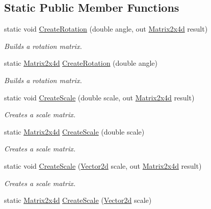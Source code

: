 \subsection*{Static Public Member Functions}
\begin{DoxyCompactItemize}
\item 
static void \hyperlink{struct_open_t_k_1_1_matrix2x4d_a724e6cc45d62b5e4b8ff8196c5c0fbd4}{Create\-Rotation} (double angle, out \hyperlink{struct_open_t_k_1_1_matrix2x4d}{Matrix2x4d} result)
\begin{DoxyCompactList}\small\item\em Builds a rotation matrix. \end{DoxyCompactList}\item 
static \hyperlink{struct_open_t_k_1_1_matrix2x4d}{Matrix2x4d} \hyperlink{struct_open_t_k_1_1_matrix2x4d_a0d8078a77dfa3958df90d6cb361e028e}{Create\-Rotation} (double angle)
\begin{DoxyCompactList}\small\item\em Builds a rotation matrix. \end{DoxyCompactList}\item 
static void \hyperlink{struct_open_t_k_1_1_matrix2x4d_adeb22dc472bba94329ecae2b73cc6a22}{Create\-Scale} (double scale, out \hyperlink{struct_open_t_k_1_1_matrix2x4d}{Matrix2x4d} result)
\begin{DoxyCompactList}\small\item\em Creates a scale matrix. \end{DoxyCompactList}\item 
static \hyperlink{struct_open_t_k_1_1_matrix2x4d}{Matrix2x4d} \hyperlink{struct_open_t_k_1_1_matrix2x4d_a24786a70e0a557087c805c5639fd072b}{Create\-Scale} (double scale)
\begin{DoxyCompactList}\small\item\em Creates a scale matrix. \end{DoxyCompactList}\item 
static void \hyperlink{struct_open_t_k_1_1_matrix2x4d_a06f7f896f263d1e538bd91985b4465a5}{Create\-Scale} (\hyperlink{struct_open_t_k_1_1_vector2d}{Vector2d} scale, out \hyperlink{struct_open_t_k_1_1_matrix2x4d}{Matrix2x4d} result)
\begin{DoxyCompactList}\small\item\em Creates a scale matrix. \end{DoxyCompactList}\item 
static \hyperlink{struct_open_t_k_1_1_matrix2x4d}{Matrix2x4d} \hyperlink{struct_open_t_k_1_1_matrix2x4d_aed78a116e7617623b1ad05d5fd6bebf6}{Create\-Scale} (\hyperlink{struct_open_t_k_1_1_vector2d}{Vector2d} scale)

\end{DoxyCompactItemize}
